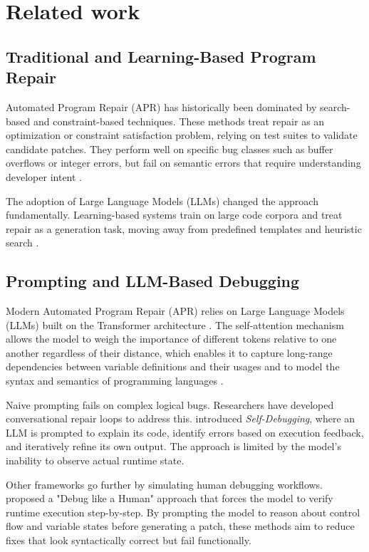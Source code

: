 \chapter{Related work}
\label{ch:related-work}

\section{Traditional and Learning-Based Program Repair}

Automated Program Repair (APR) has historically been dominated by search-based and constraint-based techniques. These methods treat repair as an optimization or constraint satisfaction problem, relying on test suites to validate candidate patches. They perform well on specific bug classes such as buffer overflows or integer errors, but fail on semantic errors that require understanding developer intent \citep{zhang2023surveylearningbasedautomatedprogram}.

The adoption of Large Language Models (LLMs) changed the approach fundamentally. Learning-based systems train on large code corpora and treat repair as a generation task, moving away from predefined templates and heuristic search \citep{yang2025surveyllmbasedautomatedprogram}.

\section{Prompting and LLM-Based Debugging}

Modern Automated Program Repair (APR) relies on Large Language Models (LLMs) built on the Transformer architecture \citep{vaswani2017attention}. The self-attention mechanism allows the model to weigh the importance of different tokens relative to one another regardless of their distance, which enables it to capture long-range dependencies between variable definitions and their usages and to model the syntax and semantics of programming languages \citep{austin2021program}.

Naive prompting fails on complex logical bugs. Researchers have developed conversational repair loops to address this. \citet{chen2023teaching} introduced \textit{Self-Debugging}, where an LLM is prompted to explain its code, identify errors based on execution feedback, and iteratively refine its own output. The approach is limited by the model's inability to observe actual runtime state.

Other frameworks go further by simulating human debugging workflows. \citet{zhong2024debug} proposed a "Debug like a Human" approach that forces the model to verify runtime execution step-by-step. By prompting the model to reason about control flow and variable states before generating a patch, these methods aim to reduce fixes that look syntactically correct but fail functionally.

